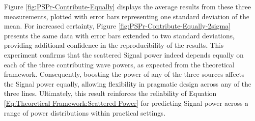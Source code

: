 Figure \ref{fig:PSPr-Contribute-Equally} displays the average results from these three measurements, plotted with error bars representing one standard deviation of the mean. For increased certainty, Figure \ref{fig:PSPr-Contribute-Equally-2sigma} presents the same data with error bars extended to two standard deviations, providing additional confidence in the reproducibility of the results. This experiment confirms that the scattered Signal power indeed depends equally on each of the three contributing wave powers, as expected from the theoretical framework. Consequently, boosting the power of any of the three sources affects the Signal power equally, allowing flexibility in pragmatic design across any of the three lines. Ultimately, this result reinforces the reliability of Equation \ref{Eq:Theoretical Framework:Scattered Power} for predicting Signal power across a range of power distributions within practical settings.

%

